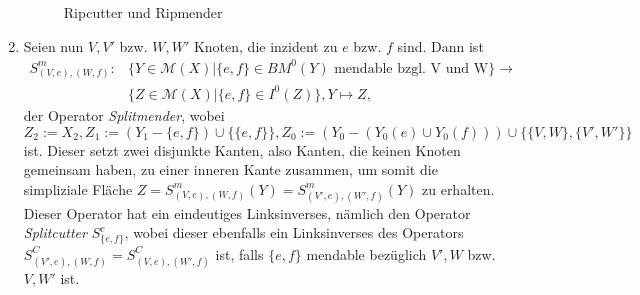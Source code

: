 \documentclass[12pt,titlepage]{article}
\begin{document}
\begin{enumerate}
\begin{figure}[H]
\caption{Ripcutter und Ripmender}
\end{figure}

  \item Seien nun $V,V'$ bzw. $W,W'$ Knoten, die inzident zu $e$ bzw. $f$ sind. Dann ist 
  \begin{align*}
  S^m_{(V,e),(W,f)}:&\{Y \in \mathcal{M}(X)|\{e,f\} \in BM^{0}(Y) \text{ mendable bzgl. V und W} \}  
  \to\\ & \{Z \in \mathcal{M}(X)|\{e,f\} \in I^{0}(Z)\}, 
  Y \mapsto Z, 
   \end{align*}
  der Operator \emph{Splitmender}, wobei $Z_2 := X_2,Z_1 := (Y_1 - \{e,f\}) \cup \{\{e,f\}\},Z_0:=(Y_0 -(Y_0 (e) \cup Y_0(f))) \cup \{\{V,W\},\{V',W'\}\}$ ist. Dieser setzt zwei disjunkte Kanten, also Kanten, die keinen Knoten gemeinsam haben, zu einer inneren Kante zusammen, um somit die simpliziale Fläche $Z=S^m_{(V,e),(W,f)}(Y)=S^m_{(V',e),(W',f)}(Y)$ zu erhalten. Dieser Operator hat ein eindeutiges Linksinverses, nämlich den Operator \emph{Splitcutter} $S^c_{\{e,f\}}$, wobei dieser ebenfalls ein Linksinverses des Operators  $S^C_{(V',e),(W,f)}=S^C_{(V,e),(W',f)}$ ist, falls $\{e,f\}$ mendable bezüglich $V',W$ bzw. $V,W'$ ist.\\
  
\end{enumerate}
\end{document}
